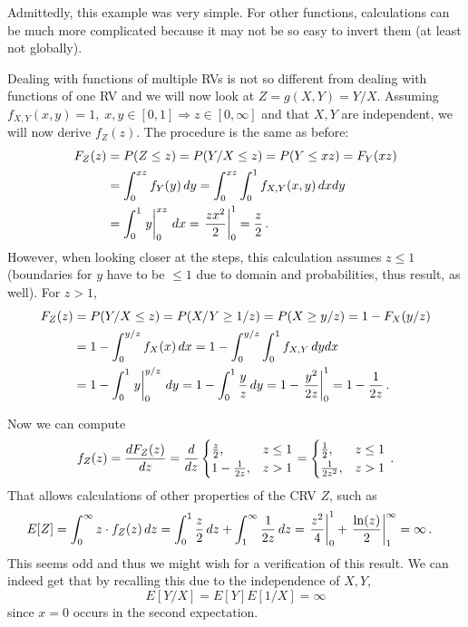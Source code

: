 Admittedly, this example was very simple. For other functions, calculations can be much more complicated because it may not be so easy to invert them (at least not globally).
\begin{ex}
Dealing with functions of multiple RVs is not so different from dealing with functions of one RV and we will now look at $Z = g(X, Y) = Y / X$. Assuming $f_{X, Y}(x, y) = 1, \; x, y \in [0, 1] \Rightarrow z \in [0, \infty]$ and that $X, Y$ are independent, we will now derive $f_Z(z)$. The procedure is the same as before:
\begin{align*}
F_Z(z) &= P(Z \leq z) = P(Y / X \leq z) = P(Y \leq x z) = F_Y(x z)
\\
&= \int_0^{x z} f_Y(y) \, dy = \int_0^{x z} \int_0^1 f_{X, Y}(x, y) \, dx dy
\\
&= \int_0^1 \eval{y}_0^{x z} \, dx = \eval{\frac{z x^2}{2}}_0^1 = \frac{z}{2} \, .
\end{align*}
However, when looking closer at the steps, this calculation assumes $z \leq 1$ (boundaries for $y$ have to be $\leq 1$ due to domain and probabilities, thus result, as well). For $z > 1$,
\begin{align*}
F_Z(z) &= P(Y / X \leq z) = P(X / Y \geq 1 / z) = P(X \geq y / z) = 1 - F_X(y / z)
\\
&= 1 - \int_0^{y / z} f_X(x) \, dx = 1 - \int_0^{y / z} \int_0^1 f_{X, Y} \, dy dx
\\
&= 1 - \int_0^1 \eval{y}_0^{y / z} \, dy = 1 - \int_0^1 \frac{y}{z} \, dy = 1 - \eval{\frac{y^2}{2 z}}_0^1 = 1 - \frac{1}{2 z} \, .
\end{align*}

Now we can compute
\begin{equation*}
f_Z(z) = \dv{F_Z(z)}{z} = \dv{z} \begin{cases} \frac{z}{2}, & z \leq 1 \\ 1 - \frac{1}{2 z}, & z > 1 \end{cases} = \begin{cases} \frac{1}{2}, & z \leq 1 \\ \frac{1}{2 z^2}, & z > 1 \end{cases} \, .
\end{equation*}
That allows calculations of other properties of the CRV $Z$, such as
\begin{align*}
E[Z] &= \int_0^\infty z \cdot f_Z(z) \, dz = \int_0^1 \frac{z}{2} \, dz + \int_1^\infty \frac{1}{2 z} \, dz = \eval{\frac{z^2}{4}}_0^1 + \eval{\frac{\ln(z)}{2}}_1^\infty = \infty \, .
\end{align*}
This seems odd and thus we might wish for a verification of this result. We can indeed get that by recalling this due to the independence of $X, Y$,
\begin{equation*}
E[Y / X] = E[Y] E[1 / X] = \infty
\end{equation*}
since $x = 0$ occurs in the second expectation.
\end{ex}

